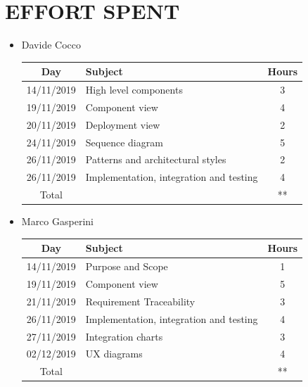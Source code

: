 \documentclass[12pt,a4paper]{article}
\begin{document}
\section{EFFORT SPENT}
\begin{itemize}
\item {Davide Cocco}
 \begin{center}
			\begin{tabular}{| c | l | c |}
				\hline
				\textbf{Day} & \textbf{Subject} & \textbf{Hours} \\ \hline
				14/11/2019 & High level components & 3 \\ \hline
				19/11/2019 & Component view & 4 \\ \hline
				20/11/2019 & Deployment view & 2 \\ \hline
24/11/2019 & Sequence diagram & 5 \\ \hline
26/11/2019 & Patterns and architectural styles & 2 \\ \hline
26/11/2019 & Implementation, integration and testing & 4 \\ \hline
				Total & & ** \\ \hline
			\end{tabular}
		\end{center}
\item {Marco Gasperini}
\begin{center}
			\begin{tabular}{| c | l | c |}
				\hline
				\textbf{Day} & \textbf{Subject} & \textbf{Hours} \\ \hline
				14/11/2019 & Purpose and Scope & 1 \\ \hline
				19/11/2019 & Component view & 5 \\ \hline
				21/11/2019 & Requirement Traceability & 3 \\ \hline
				26/11/2019 & Implementation, integration and testing & 4 \\ \hline
				27/11/2019 & Integration charts & 3 \\ \hline
				02/12/2019 & UX diagrams & 4 \\ \hline
				Total & & ** \\ \hline
			\end{tabular}
\end{center}
\end{itemize}
\end{document}

